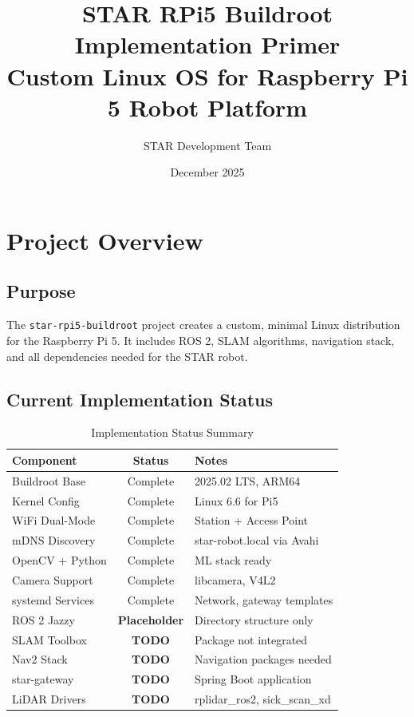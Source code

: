 \documentclass[11pt,letterpaper]{article}
\title{\textbf{STAR RPi5 Buildroot Implementation Primer}\\[0.5cm]
\large Custom Linux OS for Raspberry Pi 5 Robot Platform}
\author{STAR Development Team}
\date{December 2025}
\begin{document}
\maketitle
\tableofcontents
\newpage

\section{Project Overview}

\subsection{Purpose}

The \texttt{star-rpi5-buildroot} project creates a custom, minimal Linux distribution for the Raspberry Pi 5. It includes ROS 2, SLAM algorithms, navigation stack, and all dependencies needed for the STAR robot.

\subsection{Current Implementation Status}

\begin{table}[H]
\centering
\begin{tabular}{|l|c|l|}
\hline
\textbf{Component} & \textbf{Status} & \textbf{Notes} \\
\hline
Buildroot Base & Complete & 2025.02 LTS, ARM64 \\
Kernel Config & Complete & Linux 6.6 for Pi5 \\
WiFi Dual-Mode & Complete & Station + Access Point \\
mDNS Discovery & Complete & star-robot.local via Avahi \\
OpenCV + Python & Complete & ML stack ready \\
Camera Support & Complete & libcamera, V4L2 \\
systemd Services & Complete & Network, gateway templates \\
\hline
ROS 2 Jazzy & \textbf{Placeholder} & Directory structure only \\
SLAM Toolbox & \textbf{TODO} & Package not integrated \\
Nav2 Stack & \textbf{TODO} & Navigation packages needed \\
star-gateway & \textbf{TODO} & Spring Boot application \\
LiDAR Drivers & \textbf{TODO} & rplidar\_ros2, sick\_scan\_xd \\
\hline
\end{tabular}
\caption{Implementation Status Summary}
\end{table}
\end{document}
